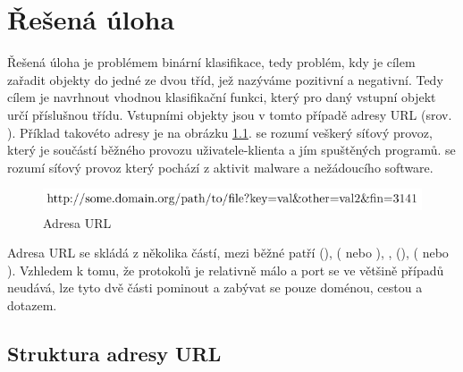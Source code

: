 \chapter{Řešená úloha}\label{problem}

Řešená úloha je problémem binární klasifikace, tedy problém, kdy je cílem zařadit objekty do jedné ze dvou tříd, jež nazýváme pozitivní a negativní. Tedy cílem je navrhnout vhodnou klasifikační funkci, který pro daný vstupní objekt určí příslušnou třídu. Vstupními objekty jsou v tomto případě adresy URL (srov. \cite{berners-lee_uniform_1994}). Příklad takovéto adresy je na obrázku \ref{url}.  se rozumí veškerý síťový provoz, který je součástí běžného provozu uživatele-klienta a jím spuštěných programů.  se rozumí síťový provoz který pochází z aktivit malware a nežádoucího software.

\begin{figure}[h]
	\caption{Adresa URL}\label{url}
	\centering
	\includegraphics{images/url/url.pdf}
\end{figure}

Adresa URL se skládá z několika částí, mezi běžné patří  (),  ( nebo ), ,  (),  ( nebo ). Vzhledem k tomu, že protokolů je relativně málo a port se ve většině případů neudává, lze tyto dvě části pominout a zabývat se pouze doménou, cestou a dotazem.

\section{Struktura adresy URL}\label{URL_structure}

